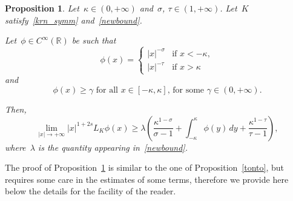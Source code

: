 \documentclass[10pt,a4paper]{amsart}
\newtheorem{prop}[theorem]{Proposition}
\numberwithin{equation}{section}
\newcommand{\R}{\mathbb{R}}
\begin{document}
\begin{prop}\label{tontobis}
Let~$\kappa\in (0, +\infty)$ and~$\sigma$, $\tau\in(1,+\infty)$. Let~$K$ satisfy~\eqref{krn_symm} and~\eqref{newbound}. 

Let~$\phi \in C^{\infty}(\R)$ be such that
\begin{equation*}
\phi(x)= \begin{cases}
|x|^{-\sigma} &\mbox{if } x<-\kappa, \\
|x|^{-\tau} &\mbox{if } x>\kappa
\end{cases}
\end{equation*}
and
\begin{equation}\label{addipotesi76bis}
{\mbox{$\phi(x)\ge\gamma$ for all~$x\in[-\kappa,\kappa]$, for some~$\gamma\in(0,+\infty)$.}}
\end{equation}

Then,
\begin{equation}\label{yuuy_secsbis}
\lim_{|x | \to  +\infty} |x|^{1+2s} {L}_K\phi(x) \geq \lambda \left( \frac{\kappa^{1-\sigma}}{\sigma-1}+ \int_{-\kappa}^{\kappa} \phi(y) \, dy+\frac{\kappa^{1-\tau}}{\tau-1}\right),
\end{equation}
where~$\lambda$ is the quantity appearing in~\eqref{newbound}.
\end{prop}

The proof of Proposition~\ref{tontobis} is similar to the one of Proposition~\ref{tonto}, but requires some care in the estimates
of some terms, therefore we provide here below the details for the facility of the reader.
\end{document}
